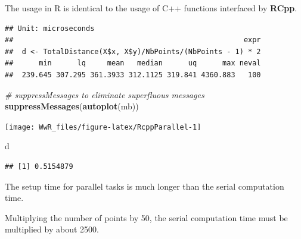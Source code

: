 \documentclass[
  12pt,
  american,
  a4paper,
  extrafontsizes,onecolumn,openright
  ]{memoir}
\newenvironment{Shaded}{\begin{snugshade}}{\end{snugshade}}
\newcommand{\CommentTok}[1]{\textcolor[rgb]{0.56,0.35,0.01}{\textit{#1}}}
\newcommand{\DecValTok}[1]{\textcolor[rgb]{0.00,0.00,0.81}{#1}}
\newcommand{\FunctionTok}[1]{\textcolor[rgb]{0.13,0.29,0.53}{\textbf{#1}}}
\newcommand{\NormalTok}[1]{#1}
\newcommand{\OtherTok}[1]{\textcolor[rgb]{0.56,0.35,0.01}{#1}}
\newcommand{\SpecialCharTok}[1]{\textcolor[rgb]{0.81,0.36,0.00}{\textbf{#1}}}
\newlength{\rf}
\begin{document}
\normalsize

The usage in R is identical to the usage of C++ functions interfaced by \textbf{RCpp}.

\scriptsize

\begin{Shaded}
\end{Shaded}

\begin{verbatim}
## Unit: microseconds
##                                                      expr
##  d <- TotalDistance(X$x, X$y)/NbPoints/(NbPoints - 1) * 2
##      min      lq     mean   median      uq      max neval
##  239.645 307.295 361.3933 312.1125 319.841 4360.883   100
\end{verbatim}

\begin{Shaded}
\begin{Highlighting}[]
\CommentTok{\# suppressMessages to eliminate superfluous messages}
\FunctionTok{suppressMessages}\NormalTok{(}\FunctionTok{autoplot}\NormalTok{(mb))}
\end{Highlighting}
\end{Shaded}

\begin{center}\texttt{[image: WwR\_files/figure-latex/RcppParallel-1]} \end{center}

\begin{Shaded}
\begin{Highlighting}[]
\NormalTok{d}
\end{Highlighting}
\end{Shaded}

\begin{verbatim}
## [1] 0.5154879
\end{verbatim}

\normalsize

The setup time for parallel tasks is much longer than the serial computation time.

Multiplying the number of points by 50, the serial computation time must be multiplied by about 2500.
\end{document}
